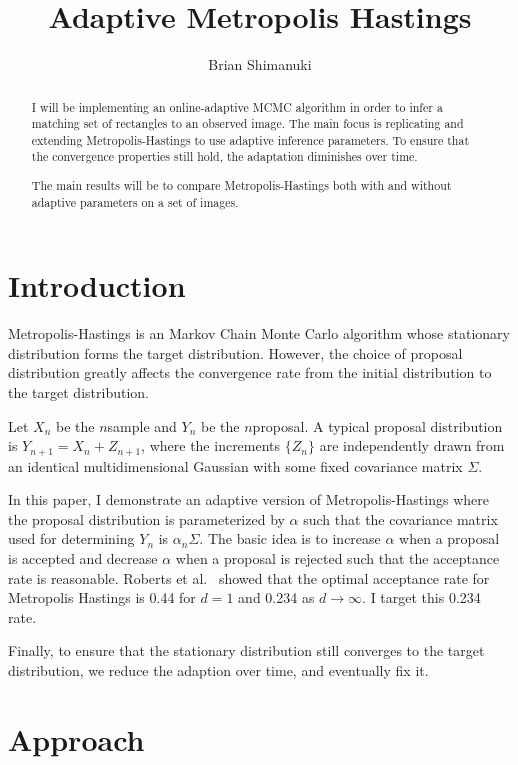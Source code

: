 \documentclass{article}
\title{Adaptive Metropolis Hastings}
\author{Brian Shimanuki}
\begin{document}
\maketitle

\begin{abstract}

I will be implementing an online-adaptive MCMC algorithm in order to infer a matching set of rectangles to an observed image. The main focus is replicating \cite{dippl} and extending Metropolis-Hastings to use adaptive inference parameters. To ensure that the convergence properties still hold, the adaptation diminishes over time.

The main results will be to compare Metropolis-Hastings both with and without adaptive parameters on a set of images.

\end{abstract}

\section{Introduction}
Metropolis-Hastings\cite{metropolis,hastings} is an Markov Chain Monte Carlo algorithm whose stationary distribution forms the target distribution. However, the choice of proposal distribution greatly affects the convergence rate from the initial distribution to the target distribution.

Let $X_n$ be the $n$\th sample and $Y_n$ be the $n$\th proposal. A typical proposal distribution is $Y_{n+1}=X_{n}+Z_{n+1}$, where the increments $\{Z_n\}$ are independently drawn from an identical multidimensional Gaussian with some fixed covariance matrix $\Sigma$.

In this paper, I demonstrate an adaptive version of Metropolis-Hastings where the proposal distribution is parameterized by $\alpha$ such that the covariance matrix used for determining $Y_n$ is $\alpha_n\Sigma$. The basic idea is to increase $\alpha$ when a proposal is accepted and decrease $\alpha$ when a proposal is rejected such that the acceptance rate is reasonable. Roberts et al.\ \cite{roberts} showed that the optimal acceptance rate for Metropolis Hastings is 0.44 for $d=1$ and 0.234 as $d\to\infty$. I target this 0.234 rate.

Finally, to ensure that the stationary distribution still converges to the target distribution, we reduce the adaption over time, and eventually fix it.

\section{Approach}
\end{document}
